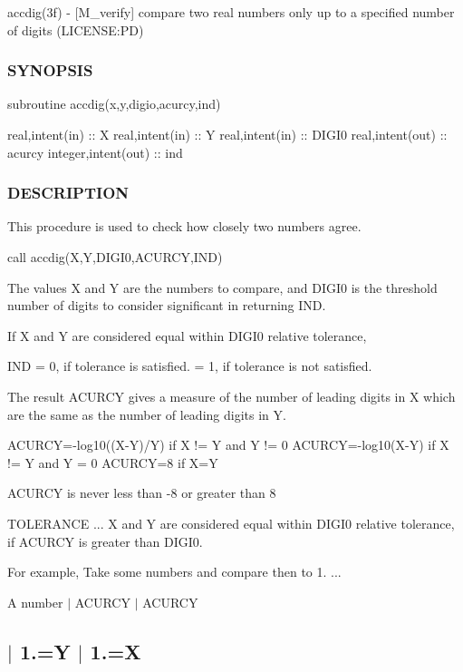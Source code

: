 accdig(3f) -\/ \mbox{[}M\+\_\+verify\mbox{]} compare two real numbers only up to a specified number of digits (L\+I\+C\+E\+N\+SE\+:PD) 

\subsubsection*{S\+Y\+N\+O\+P\+S\+IS}

\begin{DoxyVerb}   subroutine accdig(x,y,digio,acurcy,ind)

    real,intent(in)     :: X
    real,intent(in)     :: Y
    real,intent(in)     :: DIGI0
    real,intent(out)    :: acurcy
    integer,intent(out) :: ind
\end{DoxyVerb}


\subsubsection*{D\+E\+S\+C\+R\+I\+P\+T\+I\+ON}

This procedure is used to check how closely two numbers agree.

call accdig(\+X,\+Y,\+D\+I\+G\+I0,\+A\+C\+U\+R\+C\+Y,\+I\+N\+D)

The values X and Y are the numbers to compare, and D\+I\+G\+I0 is the threshold number of digits to consider significant in returning I\+ND.

If X and Y are considered equal within D\+I\+G\+I0 relative tolerance, \begin{DoxyVerb}IND    = 0, if tolerance is     satisfied.
       = 1, if tolerance is not satisfied.
\end{DoxyVerb}


The result A\+C\+U\+R\+CY gives a measure of the number of leading digits in X which are the same as the number of leading digits in Y. \begin{DoxyVerb}    ACURCY=-log10((X-Y)/Y)   if X != Y and Y != 0
    ACURCY=-log10(X-Y)       if X != Y and Y = 0
    ACURCY=8                 if X=Y

    ACURCY is never less than -8 or greater than 8
\end{DoxyVerb}


T\+O\+L\+E\+R\+A\+N\+CE ... X and Y are considered equal within D\+I\+G\+I0 relative tolerance, if A\+C\+U\+R\+CY is greater than D\+I\+G\+I0.

For example, Take some numbers and compare then to 1. ... 

 A number $\vert$ A\+C\+U\+R\+CY $\vert$ A\+C\+U\+R\+CY \subsection*{$\vert$ 1.=Y $\vert$ 1.=X }

